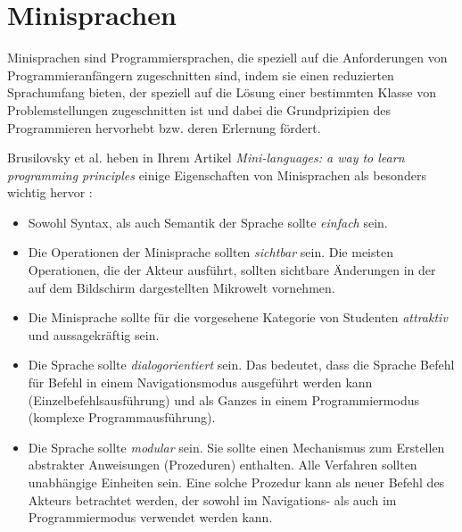 
\section{Minisprachen}

Minisprachen sind Programmiersprachen, die speziell auf die Anforderungen von Programmieranfängern zugeschnitten sind, indem sie einen reduzierten Sprachumfang bieten, der speziell auf die Lösung einer bestimmten Klasse von Problemstellungen zugeschnitten ist und dabei die Grundprizipien des Programmieren hervorhebt bzw. deren Erlernung fördert.

Brusilovsky et al. heben in Ihrem Artikel \textit{Mini-languages: a way to learn programming principles} einige Eigenschaften von Minisprachen als besonders wichtig hervor \cite[73-74]{brusilovsky1997}:

\begin{itemize}
    \item Sowohl Syntax, als auch Semantik der Sprache sollte \emph{einfach} sein.
    \item Die Operationen der Minisprache sollten \emph{sichtbar} sein. Die meisten Operationen, die der Akteur ausführt, sollten sichtbare Änderungen in der auf dem Bildschirm dargestellten Mikrowelt vornehmen.
    \item Die Minisprache sollte für die vorgesehene Kategorie von Studenten \emph{attraktiv} und aussagekräftig sein.
    \item Die Sprache sollte \emph{dialogorientiert} sein. Das bedeutet, dass die Sprache Befehl für Befehl in einem Navigationsmodus ausgeführt werden kann (Einzelbefehlsausführung) und als Ganzes in einem Programmiermodus (komplexe Programmausführung).
    \item Die Sprache sollte \emph{modular} sein. Sie sollte einen Mechanismus zum Erstellen abstrakter Anweisungen (Prozeduren) enthalten. Alle Verfahren sollten unabhängige Einheiten sein. Eine solche Prozedur kann als neuer Befehl des Akteurs betrachtet werden, der sowohl im Navigations- als auch im Programmiermodus verwendet werden kann.
\end{itemize}

